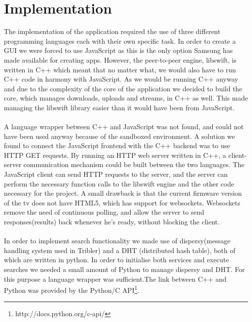 \chapter{Implementation}

The implementation of the application required the use of three different programming languages each with their own specific task. In order to create a GUI we were forced to use JavaScript as this is the only option Samsung has made available for creating apps. However, the peer-to-peer engine, libswift, is written in C++ which meant that no matter what, we would also have to run C++ code in harmony with JavaScript. As we would be running C++ anyway and due to the complexity of the core of the application we decided to build the core, which manages downloads, uploads and streams, in C++ as well. This made managing the libswift library easier than it would have been from JavaScript.
\\\\
A language wrapper between C++ and JavaScript was not found, and could not have been used anyway because of the sandboxed environment. A solution we found to connect the JavaScript frontend with the C++ backend was to use HTTP GET requests. By running an HTTP web server written in C++, a client-server communication mechanism could be built between the two languages. The JavaScript client can send HTTP requests to the server, and the server can perform the necessary function calls to the libswift engine and the other code necessary for the project. A small drawback is that the current firmware version of the tv does not have HTML5, which has support for websockets. Websockets remove the need of continuous polling, and allow the server to send responses(results) back whenever he's ready, without blocking the client. 
\\\\
In order to implement search functionality we made use of dispersy(message handling system used in Tribler) and a DHT (distributed hash table), both of which are written in python. In order to initialise both services and execute searches we needed a small amount of Python to manage dispersy and DHT. For this purpose a language wrapper was sufficient.The link between C++ and Python was provided by the Python/C API\footnote{http://docs.python.org/c-api/}.

